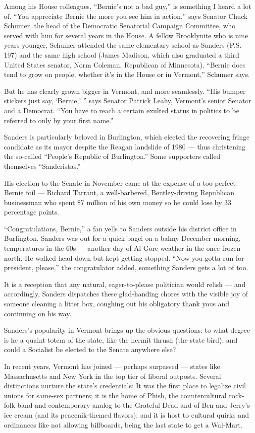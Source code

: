 Among his House colleagues, ``Bernie's not a bad guy,'' is something I
heard a lot of. ``You appreciate Bernie the more you see him in
action,'' says Senator Chuck Schumer, the head of the Democratic
Senatorial Campaign Committee, who served with him for several years in
the House. A fellow Brooklynite who is nine years younger, Schumer
attended the same elementary school as Sanders (P.S. 197) and the same
high school (James Madison, which also graduated a third United States
senator, Norm Coleman, Republican of Minnesota). ``Bernie does tend to
grow on people, whether it's in the House or in Vermont,'' Schumer says.

But he has clearly grown bigger in Vermont, and more seamlessly. ``His
bumper stickers just say, `Bernie,' '' says Senator Patrick Leahy,
Vermont's senior Senator and a Democrat. ``You have to reach a certain
exulted status in politics to be referred to only by your first name.''

Sanders is particularly beloved in Burlington, which elected the
recovering fringe candidate as its mayor despite the Reagan landslide of
1980 --- thus christening the so-called ``People's Republic of
Burlington.'' Some supporters called themselves ``Sanderistas.''

His election to the Senate in November came at the expense of a
too-perfect Bernie foil --- Richard Tarrant, a well-barbered,
Bentley-driving Republican businessman who spent \$7 million of his own
money so he could lose by 33 percentage points.

``Congratulations, Bernie,'' a fan yells to Sanders outside his district
office in Burlington. Sanders was out for a quick bagel on a balmy
December morning, temperatures in the 60s --- another day of Al Gore
weather in the once-frozen north. He walked head down but kept getting
stopped. ``Now you gotta run for president, please,'' the congratulator
added, something Sanders gets a lot of too.

It is a reception that any natural, eager-to-please politician would
relish --- and accordingly, Sanders dispatches these glad-handing chores
with the visible joy of someone cleaning a litter box, coughing out his
obligatory thank yous and continuing on his way.

Sanders's popularity in Vermont brings up the obvious questions: to what
degree is he a quaint totem of the state, like the hermit thrush (the
state bird), and could a Socialist be elected to the Senate anywhere
else?

In recent years, Vermont has joined --- perhaps surpassed --- states
like Massachusetts and New York in the top tier of liberal outposts.
Several distinctions nurture the state's credentials: It was the first
place to legalize civil unions for same-sex partners; it is the home of
Phish, the countercultural rock-folk band and contemporary analog to the
Grateful Dead and of Ben and Jerry's ice cream (and its peacenik-themed
flavors); and it is host to cultural quirks and ordinances like not
allowing billboards, being the last state to get a Wal-Mart.

